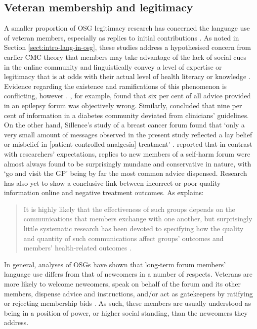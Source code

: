 \subsection{Veteran membership and legitimacy} \label{sect:vetmemb}

A smaller proportion of \gls{OSG} legitimacy research has concerned the language use of veteran members, especially as replies to initial contributions \cite{paulus_`please_2015}. As noted in Section \ref{sect:intro-lang-in-osg}, these studies address a hypothesised concern from earlier \gls{CMC} theory that \glspl{member} may take advantage of the lack of social cues in the online community and linguistically convey a level of expertise or legitimacy that is at odds with their actual level of health literacy or knowledge \cite{varga2014grieving}. Evidence regarding the existence and ramifications of this phenomenon is conflicting, however \cite{sillence_giving_2013}. \textcite{hoch_information_1999}, for example, found that six per cent of all advice provided in an epilepsy \gls{forum} was objectively wrong. Similarly, \textcite{hoffman-goetz_clinical_2009} concluded that nine per cent of information in a diabetes community deviated from clinicians' guidelines. On the other hand, Sillence's study of a breast cancer \gls{forum} found that `only a very small amount of messages observed in the present study reflected a lay belief or misbelief in [patient-controlled analgesia] treatment' \parencite*[p.~8]{sillence_communicating_2012}. \textcite{smithson_problem_2011} reported that in contrast with researchers' expectations, replies to new \glspl{member} of a self\hyp{}harm \gls{forum} were almost always found to be surprisingly mundane and conservative in nature, with `go and visit the GP' being by far the most common advice dispensed. Research has also yet to show a conclusive link between incorrect or poor quality information online and negative treatment outcomes. As \citeauthor{wang_stay_2012} explains:

\begin{quote}\small\singlespacing
It is highly likely that the effectiveness of such groups depends on the communications that \glspl{member} exchange with one another, but surprisingly little systematic research has been devoted to specifying how the quality and quantity of such communications affect groups' outcomes and members' health\hyp{}related outcomes \parencite*[p.~1]{wang_stay_2012}.
\end{quote}

In general, analyses of \glspl{OSG} have shown that long\hyp{}term \gls{forum} \glspl{member}' language use differs from that of newcomers in a number of respects. Veterans are more likely to welcome newcomers, speak on behalf of the \gls{forum} and its other members, dispense advice and instructions, and\slash or act as gatekeepers by ratifying or rejecting membership bids \cite{paulus_`please_2015,pederson_supporting_2010,weber_missed_2011}. As such, these \glspl{member} are usually understood as being in a position of power, or higher social standing, than the newcomers they address.

